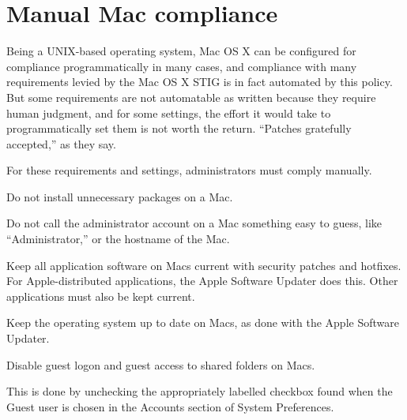\section{Manual Mac compliance}
\label{ManualMac}

Being a UNIX-based operating system, Mac OS X can be configured for
compliance programmatically in many cases, and compliance with many
requirements levied by the Mac OS X STIG is in fact automated by this
policy. But some requirements are not automatable as written because they
require human judgment, and for some settings, the effort it would take to
programmatically set them is not worth the return. ``Patches gratefully
accepted,'' as they say.

For these requirements and settings, administrators must comply manually.

\dinkus

%
%
Do not install unnecessary packages on a Mac.

%
Do not call the administrator account on a Mac something easy to guess,
like ``Administrator,'' or the hostname of the Mac.

%
Keep all application software on Macs current with security patches and
hotfixes. For Apple-distributed applications, the Apple Software Updater
does this. Other applications must also be kept current.

%
%
Keep the operating system up to date on Macs, as done with the Apple
Software Updater.

%
Disable guest logon and guest access to shared folders on Macs.

This is done by unchecking the appropriately labelled checkbox found when
the Guest user is chosen in the Accounts section of System Preferences.

